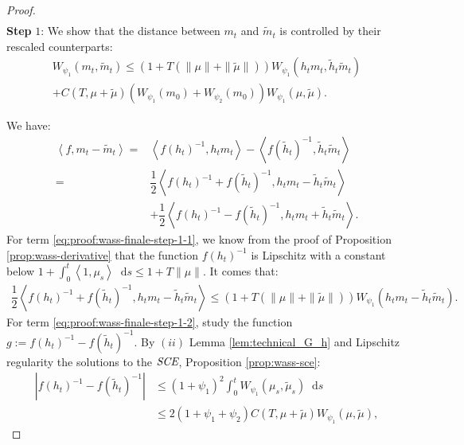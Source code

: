 \documentclass[11pt,a4paper]{article}
\newcommand{\SCE}{\emph{SCE}}
\newcommand{\brac}[1]{\left\langle#1\right\rangle}
\newcommand{\dd}{\mathop{}\!\mathrm{d}}
\begin{document}
\begin{proof}
\begin{align*}
    \end{align*}
    \textbf{Step} $1$: We show that the distance between $m_t$ and $\tilde{m}_t$ is controlled by their rescaled counterparts:
    \begin{multline*}
        W_{\psi_1}(m_t ,\tilde{m}_t) \leq \left( 1 + T\left(\|\mu\| + \|\tilde{\mu}\|\right)\right)W_{\psi_1}(h_tm_t , \tilde{h}_t\tilde{m}_t) \\
        + C(T,\mu + \tilde{\mu})\left(W_{\psi_1}(m_0) + W_{\psi_2}(m_0)\right)W_{\psi_1}(\mu,\tilde{\mu}).
    \end{multline*}

    We have:
    \begin{subequations}
    \begin{align}
        \brac{f,m_t-\tilde{m}_t} 
        =& \brac{f(h_t)^{-1}, h_t m_t} - \brac{f(\tilde{h}_t)^{-1},\tilde{h}_t\tilde{m}_t}\nonumber \\
        =& \dfrac12\brac{f(h_t)^{-1} + f(\tilde{h}_t)^{-1}  ,h_tm_t - \tilde{h}_t\tilde{m}_t} \label{eq:proof:wass-finale-step-1-1} \\
        &+ \dfrac12\brac{f(h_t)^{-1} - f(\tilde{h}_t)^{-1},h_t m_t + \tilde{h}_t\tilde{m}_t} \label{eq:proof:wass-finale-step-1-2} .
    \end{align}
    \label{eq:proof:wass-finale-step-1}
    \end{subequations}
    For term \eqref{eq:proof:wass-finale-step-1-1}, we know from the proof of Proposition \ref{prop:wass-derivative} that the function $f(h_t)^{-1}$ is Lipschitz with a constant below $1 + \int_0^t \brac{1,\mu_s} \dd s \leq 1 + T\|\mu\|$. It comes that:
    \begin{align*}
        \dfrac12\brac{f(h_t)^{-1} + f(\tilde{h}_t)^{-1}  ,h_tm_t - \tilde{h}_t\tilde{m}_t}
        \leq\left( 1 + T\left(\|\mu\| + \|\tilde{\mu}\|\right)\right)W_{\psi_1}(h_tm_t - \tilde{h}_t\tilde{m}_t).
    \end{align*}
    For term \eqref{eq:proof:wass-finale-step-1-2}, study the function $g:= f(h_t)^{-1} - f(\tilde{h}_t)^{-1}$. By $(ii)$ Lemma \ref{lem:technical_G_h} and Lipschitz regularity the solutions to the $\SCE$, Proposition \ref{prop:wass-sce}:
    \begin{align*}
        \left| f(h_t)^{-1} - f(\tilde{h}_t)^{-1}\right|
        &\leq (1 + \psi_1)^2 \int_0^t W_{\psi_1}(\mu_s,\tilde{\mu}_s) \dd s \\
        &\leq 2\left( 1 + \psi_1 + \psi_2\right) C(T,\mu + \tilde{\mu})W_{\psi_1}(\mu,\tilde{\mu}),
    \end{align*}

\end{proof}
\end{document}
